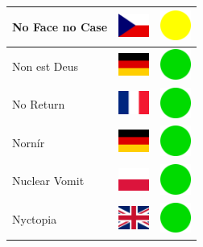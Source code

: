\documentclass[12pt, a4paper, twoside]{report}
\begin{document}
\begin{center}
\begin{longtable}{|p{5cm}|p{2cm}|p{2cm}|}
 No Face no Case                                            & \includegraphics[width=1cm]{../img/flags/cz} &   \includegraphics[width=1cm]{../likes/m} \\ \hline
 Non est Deus                                               & \includegraphics[width=1cm]{../img/flags/de} &   \includegraphics[width=1cm]{../likes/y} \\ \hline
 No Return                                                  & \includegraphics[width=1cm]{../img/flags/fr} &   \includegraphics[width=1cm]{../likes/y} \\ \hline
 Nornír                                                     & \includegraphics[width=1cm]{../img/flags/de} &   \includegraphics[width=1cm]{../likes/y} \\ \hline
 Nuclear Vomit                                              & \includegraphics[width=1cm]{../img/flags/pl} &   \includegraphics[width=1cm]{../likes/y} \\ \hline
 Nyctopia                                                   & \includegraphics[width=1cm]{../img/flags/gb} &   \includegraphics[width=1cm]{../likes/y} \\ \hline

\end{longtable}
\end{center}
\end{document}
